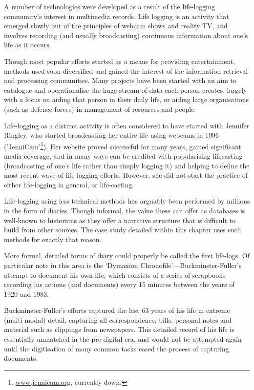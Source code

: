 A number of technologies were developed as a result of the life-logging community's interest in multimedia records.  Life logging is an activity that emerged slowly out of the principles of webcam shows and reality TV, and involves recording (and usually broadcasting) continuous information about one's life as it occurs.

Though most popular efforts started as a means for providing entertainment, methods used soon diversified and gained the interest of the information retrieval and processing communities.  Many projects have been started with an aim to catalogue and operationalise the huge stream of data each person creates, largely with a focus on aiding that person in their daily life, or aiding large organisations (such as defence forces) in management of resources and people.





Life-logging as a distinct activity is often considered to have started with Jennifer Ringley, who started broadcasting her entire life using webcams in 1996 ('JenniCam'\footnote{\url{www.jennicam.org}, currently down.}).  Her website proved successful for many years, gained significant media coverage, and in many ways can be credited with popularising lifecasting (broadcasting of one's life rather than simply logging it) and helping to define the most recent wave of life-logging efforts.  However, she did not start the practice of either life-logging in general, or life-casting.


Life-logging using less technical methods has arguably been performed by millions in the form of diaries.  Though informal, the value these can offer as databases is well-known to historians as they offer a narrative structure that is difficult to build from other sources. The case study detailed within this chapter uses such methods for exactly that reason.


More formal, detailed forms of diary could properly be called the first life-logs.  Of particular note in this area is the `Dymaxion Chronofile'---Buckminster-Fuller's attempt to document his own life, which consists of a series of scrapbooks recording his actions (and documents) every 15 minutes between the years of 1920 and 1983.

Buckminster-Fuller's efforts captured the last 63 years of his life in extreme (multi-modal) detail, capturing all correspondence, bills, personal notes and material such as clippings from newspapers.  This detailed record of his life is essentially unmatched in the pre-digital era, and would not be attempted again until the digitisation of many common tasks eased the process of capturing documents.


